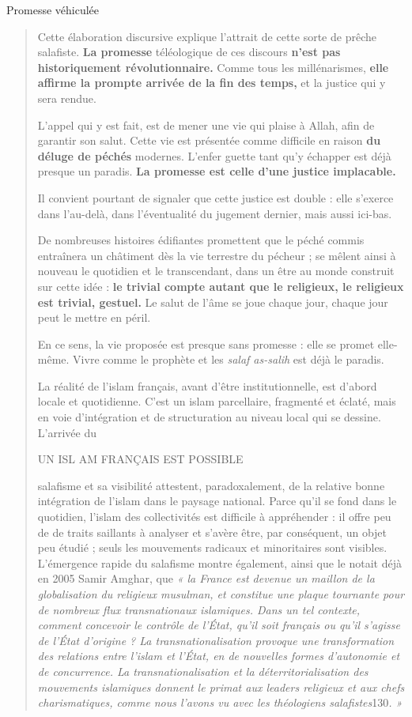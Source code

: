 Promesse véhiculée

\begin{quote}
Cette élaboration discursive explique l'attrait de cette sorte de prêche
salafiste. \textbf{La promesse} téléologique de ces discours
\textbf{n'est pas historiquement révolutionnaire.} Comme tous les
millénarismes, \textbf{elle affirme la prompte arrivée de la fin des
temps,} et la justice qui y sera rendue.

L'appel qui y est fait, est de mener une vie qui plaise à Allah, afin de
garantir son salut. Cette vie est présentée comme difficile en raison
\textbf{du déluge de péchés} modernes. L'enfer guette tant qu'y échapper
est déjà presque un paradis. \textbf{La promesse est celle d'une justice
implacable.}

Il convient pourtant de signaler que cette justice est double : elle
s'exerce dans l'au-delà, dans l'éventualité du jugement dernier, mais
aussi ici-bas.

De nombreuses histoires édifiantes promettent que le péché commis
entraînera un châtiment dès la vie terrestre du pécheur ; se mêlent
ainsi à nouveau le quotidien et le transcendant, dans un être au monde
construit sur cette idée : \textbf{le trivial compte autant que le
religieux, le religieux est trivial, gestuel.} Le salut de l'âme se joue
chaque jour, chaque jour peut le mettre en péril.

En ce sens, la vie proposée est presque sans promesse : elle se promet
elle- même. Vivre comme le prophète et les \emph{salaf as-salih} est
déjà le paradis.

La réalité de l'islam français, avant d'être institutionnelle, est
d'abord locale et quotidienne. C'est un islam parcellaire, fragmenté et
éclaté, mais en voie d'intégration et de structuration au niveau local
qui se dessine. L'arrivée du

UN ISL AM FRANÇAIS EST POSSIBLE

salafisme et sa visibilité attestent, paradoxalement, de la relative
bonne intégration de l'islam dans le paysage national. Parce qu'il se
fond dans le quotidien, l'islam des collectivités est difficile à
appréhender : il offre peu de de traits saillants à analyser et s'avère
être, par conséquent, un objet peu étudié ; seuls les mouvements
radicaux et minoritaires sont visibles. L'émergence rapide du salafisme
montre également, ainsi que le notait déjà en 2005 Samir Amghar, que
\emph{« la France est devenue un maillon de la globalisation du
religieux musulman, et constitue une plaque tournante pour de nombreux
flux transnationaux islamiques. Dans un tel contexte, comment concevoir
le contrôle de l'État, qu'il soit français ou qu'il s'agisse de l'État
d'origine ? La transnationalisation provoque une transformation des
relations entre l'islam et l'État, en de nouvelles formes d'autonomie et
de concurrence. La transnationalisation et la déterritorialisation des
mouvements islamiques donnent le primat aux leaders religieux et aux
chefs charismatiques, comme nous l'avons vu avec les théologiens
salafistes}130\emph{. »}


\end{quote}
